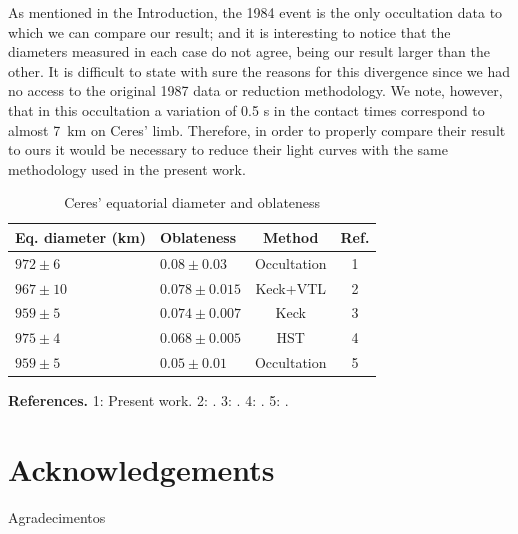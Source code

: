 \documentclass[useAMS,usenatbib]{mn2e}
\begin{document}
As mentioned in the Introduction, the 1984 event \citep{Millis1987} is the only occultation data to which we can compare our result; and it is interesting to notice that the diameters measured in each case do not agree, being our result larger than the other. It is difficult to state with sure the reasons for this divergence since we had no access to the original 1987 data or reduction methodology. We note, however, that in this occultation a variation of 0.5 s in the contact times correspond to almost 7~km on Ceres' limb. Therefore, in order to properly compare their result to ours it would be necessary to reduce their light curves with the same methodology used in the present work.



\begin{table}
 \centering
 \begin{minipage}{140mm}
  \caption{Ceres' equatorial diameter and oblateness}
  \begin{tabular}{@{}llcc}
  \hline
     Eq. diameter (km) & Oblateness & Method & Ref. \\
\hline
$972 \pm 6$  & $0.08  \pm 0.03$  & Occultation & 1\\
$967 \pm 10$ & $0.078 \pm 0.015$ & Keck+VTL    & 2 \\
$959 \pm 5$  & $0.074 \pm 0.007$ & Keck        & 3\\
$975 \pm 4$  & $0.068 \pm 0.005$ & HST         & 4\\
$959 \pm 5$  & $0.05  \pm 0.01$  & Occultation & 5\\
\hline
\end{tabular}
\textbf{References.} 1: Present work. 2: \cite{Drummond2014}. 3: \cite{Carry2008}. 4: \cite{Thomas2005}. 5: \cite{Millis1987}.
\end{minipage}
\end{table}



\section*{Acknowledgements}

Agradecimentos
\end{document}

